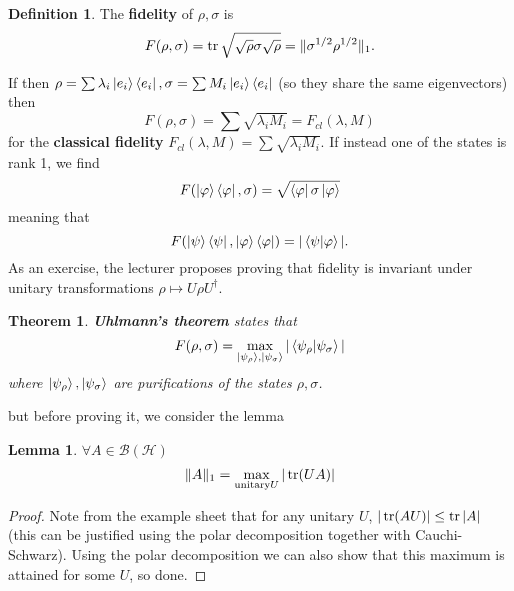 \documentclass{article}
\newtheorem{lemma}{Lemma}
\newtheorem{theorem}{Theorem}
\theoremstyle{definition}
\newtheorem{definition}{Definition}
\begin{document}
\begin{definition}
  The \textbf{fidelity} of $\rho, \sigma$ is 
  \begin{equation}
    F(\rho, \sigma) = \tr \sqrt{\sqrt{\rho} \sigma \sqrt{\rho}} = 
    \| \sigma^{1/2} \rho^{1/2} \|_1.
  \end{equation}
\end{definition}
If then $\rho = \sum \lambda_i \ket{e_i} \bra{e_i}, \sigma = \sum M_i
\ket{e_i} \bra{e_i}$ (so they share the same eigenvectors) then
\begin{equation}
  F(\rho, \sigma) = \sum \sqrt{\lambda_i M_i} = F_{cl}(\lambda, M)
\end{equation}
for the \textbf{classical fidelity} $F_{cl}(\lambda, M) = \sum 
\sqrt{\lambda_i M_i}$. If instead one of the states is rank 1, we find
\begin{equation}
  F(\ket \varphi \bra \varphi, \sigma) = \sqrt{\bra\varphi \sigma \ket \varphi}
\end{equation}
meaning that
\begin{equation}
  F(\ket \psi \bra \psi, \ket \varphi \bra \varphi) = 
  | \bra{\psi} \ket{\varphi} |.
\end{equation}
As an exercise, the lecturer proposes proving that fidelity is invariant under
unitary transformations $\rho \mapsto U\rho U^\dagger$.

\begin{theorem}
  \textbf{Uhlmann's theorem} states that
  \begin{equation}
    F(\rho, \sigma) = \max_{\ket{\psi_\rho}, \ket{\psi_\sigma}} 
    |\bra{\psi_\rho} \ket{\psi_\sigma}|
  \end{equation}
  where $\ket{\psi_\rho}, \ket{\psi_\sigma}$ are purifications of the states
  $\rho, \sigma$.
\end{theorem}
but before proving it, we consider the lemma
\begin{lemma}
  $ \forall A \in \mathcal{B(H)}$
  \begin{equation}
    \| A\|_1 = \max_{\mathrm{unitary } U} |\tr (UA)|
  \end{equation}
\end{lemma}
\begin{proof}
  Note from the example sheet that for any unitary $U$, 
  $|\tr(AU)| \leq \tr|A|$ (this can be justified using the polar decomposition
  together with Cauchi-Schwarz). Using the polar decomposition we can also show
  that this maximum is attained for some $U$, so done.
\end{proof}
\end{document}
